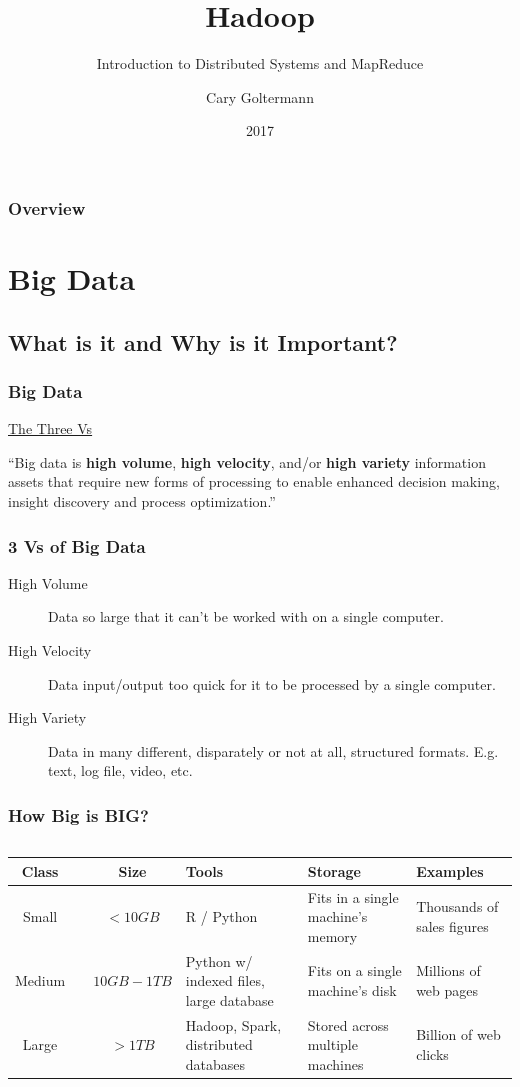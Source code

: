 \documentclass{beamer}
\title{Hadoop}
\subtitle{Introduction to Distributed Systems and MapReduce}
\author{Cary Goltermann}
\institute{Galvanize}
\date{2017}
\begin{document}
 
\frame{\titlepage}
 
\begin{frame}
  \frametitle{Overview}
  \tableofcontents[]
\end{frame}

\section{Big Data}
\subsection{What is it and Why is it Important?}
\begin{frame}
  \frametitle{Big Data}
  \centering
  \underline{\LARGE The Three Vs}
  \vspace{6mm}
  \begin{block}{}
    {\large ``Big data is \textbf{high volume}, \textbf{high velocity}, and/or \textbf{high variety} information assets that require new forms of processing to enable enhanced decision making, insight discovery and process optimization.''}
    \vspace{5mm}
    \hspace*{}
  \end{block}
\end{frame}

\begin{frame}
  \frametitle{3 Vs of Big Data}
  \begin{description}
    \item [High Volume] Data so large that it can't be worked with on a single computer.
    \item [High Velocity] Data input/output too quick for it to be processed by a single computer.
    \item [High Variety] Data in many different, disparately or not at all, structured formats. E.g. text, log file, video, etc.
  \end{description}
\end{frame}

\begin{frame}
  \frametitle{How Big is BIG?}
  \begin{columns}
    \column{\dimexpr\paperwidth-10pt}
    \small
    \begin{tabulary}{\textwidth}{|CC|C|L|L|L|}
      \hline
      \textbf{Class} & &\textbf{Size} & \textbf{Tools} & \textbf{Storage} & \textbf{Examples} \\
      \hline
      Small & & $< 10 GB$ & R / Python & Fits in a single machine's memory & Thousands of sales figures \\ 
      \hline
      Medium & & $10 GB - 1 TB$ & Python w/ indexed files, large database & Fits on a single machine's disk & Millions of web pages \\ 
      \hline
      Large & & $ > 1 TB$ & Hadoop, Spark, distributed databases & Stored across multiple machines & Billion of web clicks \\ 
      \hline
    \end{tabulary}
  \end{columns}
\end{frame}
\end{document}
